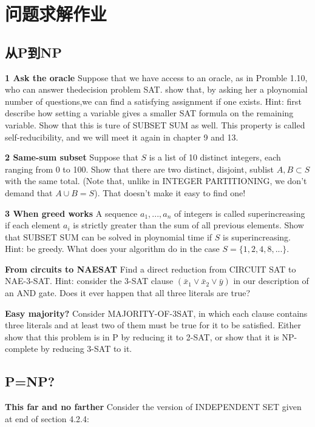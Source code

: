 \documentclass[a4paper,UTF8]{article}
\begin{document}
\section*{问题求解作业}
\subsection{从P到NP}
\textbf{1 Ask the oracle} Suppose that we have access to an oracle, as in Promble 1.10,
who can answer thedecision problem SAT. show that, by asking her a ploynomial
number of questions,we can find a satisfying assignment if one exists. Hint:
first describe how setting a variable gives a smaller SAT formula on the remaining
variable. Show that this is ture of SUBSET SUM as well. This property is called
self-reducibility, and we will meet it again in chapter 9 and 13.

 \vspace{6pt}

\textbf{2 Same-sum subset} Suppose that $S$ is a list of 10 distinct integers, each
ranging from 0 to 100. Show that there are two distinct, disjoint, sublist $A,B\subset S$
with the same total. (Note that, unlike in INTEGER PARTITIONING, we don't demand that $A\cup B = S$).
That doesn't make it easy to find one!

 \vspace{6pt}

\textbf{3 When greed works} A sequence $a_{1},...,a_{n}$ of integers is called superincreasing
if each element $a_{i}$ is strictly greater than the sum of all previous elements.
Show that SUBSET SUM can be solved in ploynomial time if $S$ is superincreasing.
Hint: be greedy. What does your algorithm do in the case $S=\{1,2,4,8,...\}$.

\vspace{6pt}

\textbf{From circuits to NAESAT} Find a direct reduction from CIRCUIT SAT to NAE-3-SAT.
Hint: consider the 3-SAT clause $(\bar{x}_{1} \vee \bar{x}_{2} \vee \bar{y})$ in our description
of an AND gate. Does it ever happen that all three literals are true?

\vspace{6pt}

\textbf{Easy majority?} Consider MAJORITY-OF-3SAT, in which each clause contains
three literals and at least two of them must be true for it to be satisfied. Either
show that this problem is in P by reducing it to 2-SAT, or show that it is NP-complete
by reducing 3-SAT to it.

\subsection{P=NP?}
\textbf{This far and no farther} Consider the version of INDEPENDENT SET given at
end of section 4.2.4:
\begin{center}
\end{center}
\end{document}
